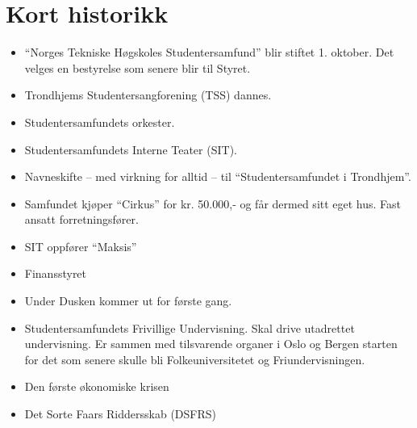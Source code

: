 \chapter{Kort historikk}


\begin{itemize}
	\item ``Norges Tekniske Høgskoles Studentersamfund'' blir stiftet 1. oktober. Det velges en bestyrelse som senere blir
	til Styret.
	\item Trondhjems Studentersangforening (TSS) dannes.
  \item Studentersamfundets orkester.
  \item Studentersamfundets Interne Teater (SIT).
\end{itemize}


\begin{itemize}
	\item Navneskifte -- med virkning for alltid -- til ``Studentersamfundet i Trondhjem''.
  \item Samfundet kjøper ``Cirkus'' for kr. 50.000,- og får dermed sitt eget hus. Fast ansatt forretningsfører.
\end{itemize}


\begin{itemize}
  \item SIT oppfører ``Maksis''
  \item Finansstyret
\end{itemize}


\begin{itemize}
  \item Under Dusken kommer ut for første gang.
  \item Studentersamfundets Frivillige Undervisning. Skal drive utadrettet undervisning. Er sammen med tilsvarende
organer i Oslo og Bergen starten for det som senere skulle bli Folkeuniversitetet og Friundervisningen.
\end{itemize}


\begin{itemize}
  \item Den første økonomiske krisen
\end{itemize}


\begin{itemize}
  \item Det Sorte Faars Riddersskab (DSFRS)
\end{itemize}

